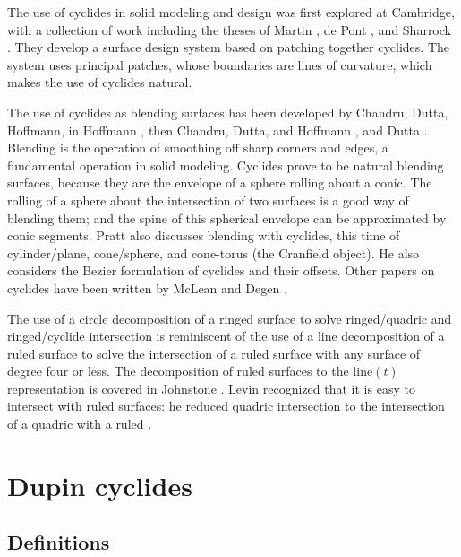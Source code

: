 The use of cyclides in solid modeling and design was first explored
at Cambridge, with a collection of work including the theses of Martin 
\cite{MAR82}, de Pont \cite{DEP84}, and Sharrock \cite{SHAR85}.
They develop a surface design system based on patching together cyclides.
The system uses principal patches, whose boundaries are lines of curvature, 
which makes the use of cyclides natural.

The use of cyclides as blending surfaces has been developed by Chandru, Dutta, 
Hoffmann, in Hoffmann \cite{H88}, then Chandru, Dutta, and Hoffmann 
\cite{CDH89b-ifip}, and Dutta \cite{Dutta89}.
Blending is the operation of smoothing off sharp corners and edges,
a fundamental operation in solid modeling.
Cyclides prove to be natural blending surfaces,
because they are the envelope of a sphere rolling about a conic.
The rolling of a sphere about the intersection of two surfaces is a good way
of blending them; and the spine of this spherical envelope can be approximated
by conic segments.
Pratt \cite{P89} also discusses blending with cyclides,
this time of cylinder/plane, 
cone/sphere, and cone-torus (the Cranfield object).
He also considers the Bezier formulation of cyclides and their offsets.
Other papers on cyclides have been written by McLean \cite{Mc85} and Degen
\cite{Degen90}.

The use of a circle decomposition of a ringed surface to solve
ringed/quadric and ringed/cyclide intersection is reminiscent of the use
of a line decomposition of a ruled surface to solve the intersection
of a ruled surface with any surface of degree four or less.
The decomposition of ruled surfaces to the $\mbox{line}(t)$ representation 
is covered in Johnstone \cite{JOH89}.
Levin recognized that it is easy to intersect with ruled surfaces: 
he reduced quadric intersection to the 
intersection of a quadric with a ruled \cite{LEVI76}.


% 

\section{Dupin cyclides}
\label{sec-cy}

\subsection{Definitions}

